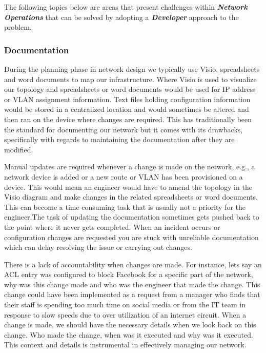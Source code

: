 \documentclass[12pt, letterpaper]{article}
\begin{document}
\medskip

The following topics below are areas that present challenges within \textbf{\textit{Network Operations}} that can be solved by adopting a \textbf{\textit{Developer}} approach to the problem.

	\subsubsection{Documentation}
During the planning phase in network design we typically use Visio, spreadsheets and word documents to map our infrastructure. Where Visio is used to visualize our topology and spreadsheets or word documents would be used for IP address or VLAN assignment information. Text files holding configuration information would be stored in a centralized location and would sometimes be altered and then ran on the device where changes are required. This has traditionally been the standard for documenting our network but it comes with its drawbacks, specifically with regards to maintaining the documentation after they are modified.

\medskip

Manual updates are required whenever a change is made on the network, e.g., a network device is added or a new route or VLAN has been provisioned on a device. This would mean an engineer would have to amend the topology in the Visio diagram and make changes in the related spreadsheets or word documents. This can become a time consuming task that is usually not a priority for the engineer.The task of updating the documentation sometimes gets pushed back to the point where it never gets completed. When an incident occurs or configuration changes are requested you are stuck with unreliable documentation which can delay resolving the issue or carrying out changes.

\medskip

There is a lack of accountability when changes are made. For instance, lets say an ACL entry was configured to block Facebook for a specific part of the network, why was this change made and who was the engineer that made the change. This change could have been implemented as a request from a manager who finds that their staff is spending too much time on social media or from the IT team in response to slow speeds due to over utilization of an internet circuit.
When a change is made, we should have the necessary details when we look back on this change. Who made the change, when was it executed and why was it executed. This context and details is instrumental in effectively managing our network.
\end{document}
